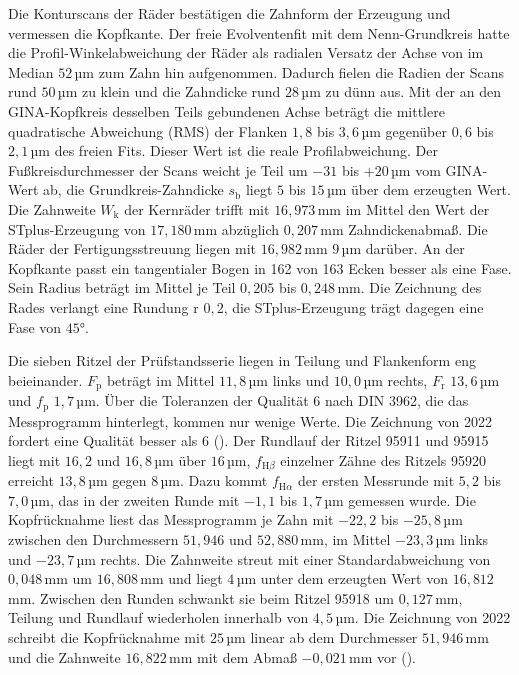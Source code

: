 Die Konturscans der Räder bestätigen die Zahnform der Erzeugung und vermessen die Kopfkante. Der freie Evolventenfit mit dem Nenn-Grundkreis hatte die Profil-Winkelabweichung der Räder als radialen Versatz der Achse von im Median $52$\,µm zum Zahn hin aufgenommen. Dadurch fielen die Radien der Scans rund $50$\,µm zu klein und die Zahndicke rund $28$\,µm zu dünn aus. Mit der an den GINA-Kopfkreis desselben Teils gebundenen Achse beträgt die mittlere quadratische Abweichung (RMS) der Flanken $1{,}8$ bis $3{,}6$\,µm gegenüber $0{,}6$ bis $2{,}1$\,µm des freien Fits. Dieser Wert ist die reale Profilabweichung. Der Fußkreisdurchmesser der Scans weicht je Teil um $-31$ bis $+20$\,µm vom GINA-Wert ab, die Grundkreis-Zahndicke $s_{\mathrm{b}}$ liegt $5$ bis $15$\,µm über dem erzeugten Wert. Die Zahnweite $W_{\mathrm{k}}$ der Kernräder trifft mit $16{,}973$\,mm im Mittel den Wert der STplus-Erzeugung von $17{,}180$\,mm abzüglich $0{,}207$\,mm Zahndickenabmaß. Die Räder der Fertigungsstreuung liegen mit $16{,}982$\,mm $9$\,µm darüber. An der Kopfkante passt ein tangentialer Bogen in 162 von 163 Ecken besser als eine Fase. Sein Radius beträgt im Mittel je Teil $0{,}205$ bis $0{,}248$\,mm. Die Zeichnung des Rades verlangt eine Rundung r $0{,}2$, die STplus-Erzeugung trägt dagegen eine Fase von $45$°.

Die sieben Ritzel der Prüfstandsserie liegen in Teilung und Flankenform eng beieinander. $F_{\mathrm{p}}$ beträgt im Mittel $11{,}8$\,µm links und $10{,}0$\,µm rechts, $F_{\mathrm{r}}$ $13{,}6$\,µm und $f_{\mathrm{p}}$ $1{,}7$\,µm. Über die Toleranzen der Qualität 6 nach DIN 3962, die das Messprogramm hinterlegt, kommen nur wenige Werte. Die Zeichnung von 2022 fordert eine Qualität besser als 6 (). Der Rundlauf der Ritzel 95911 und 95915 liegt mit $16{,}2$ und $16{,}8$\,µm über $16$\,µm, $f_{\mathrm{H}\beta}$ einzelner Zähne des Ritzels 95920 erreicht $13{,}8$\,µm gegen $8$\,µm. Dazu kommt $f_{\mathrm{H}\alpha}$ der ersten Messrunde mit $5{,}2$ bis $7{,}0$\,µm, das in der zweiten Runde mit $-1{,}1$ bis $1{,}7$\,µm gemessen wurde. Die Kopfrücknahme liest das Messprogramm je Zahn mit $-22{,}2$ bis $-25{,}8$\,µm zwischen den Durchmessern $51{,}946$ und $52{,}880$\,mm, im Mittel $-23{,}3$\,µm links und $-23{,}7$\,µm rechts. Die Zahnweite streut mit einer Standardabweichung von $0{,}048$\,mm um $16{,}808$\,mm und liegt $4$\,µm unter dem erzeugten Wert von $16{,}812$\,mm. Zwischen den Runden schwankt sie beim Ritzel 95918 um $0{,}127$\,mm, Teilung und Rundlauf wiederholen innerhalb von $4{,}5$\,µm. Die Zeichnung von 2022 schreibt die Kopfrücknahme mit $25$\,µm linear ab dem Durchmesser $51{,}946$\,mm und die Zahnweite $16{,}822$\,mm mit dem Abmaß $-0{,}021$\,mm vor ().

